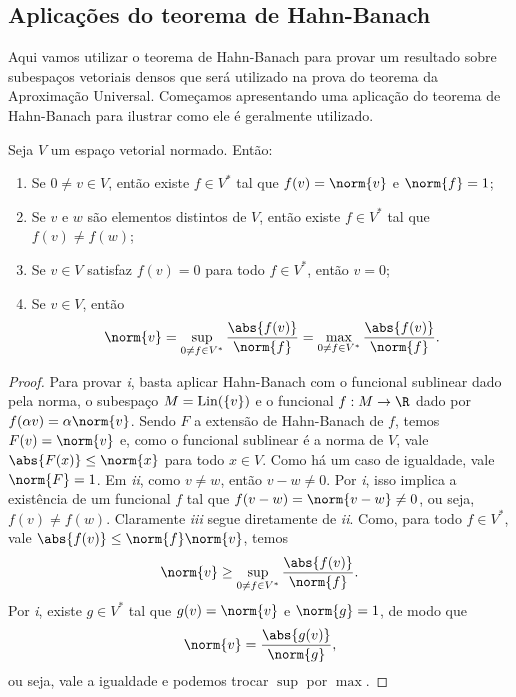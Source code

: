 \subsection{Aplicações do teorema de Hahn-Banach}

Aqui vamos utilizar o teorema de Hahn-Banach para provar um resultado sobre subespaços vetoriais densos que será utilizado na prova do teorema da Aproximação Universal.
Começamos apresentando uma aplicação do teorema de Hahn-Banach para ilustrar como ele é geralmente utilizado.

\begin{teo}
    Seja \( V \) um espaço vetorial normado.
    Então:
    \begin{enumerate}[label=\roman*)]
        \item Se \( 0 \neq v \in V \), então existe \( f \in V^{ * } \) tal que \( f(v) = \norm{ v } \) e \( \norm{ f } = 1 \);
        \item Se \( v \) e \( w \) são elementos distintos de \( V \), então existe \( f \in V^{ * } \) tal que \( f(v) \neq f(w) \);
        \item Se \( v \in V \) satisfaz \( f(v) = 0 \) para todo \( f \in V^{ * } \), então \( v = 0 \);
        \item Se \( v \in V \), então
        \begin{equation}
            \norm{ v }
            = \sup_{ 0 \neq f \in V^{ * } } \frac{ \abs{ f(v) } }{ \norm{ f } }
            = \max_{ 0 \neq f \in V^{ * } } \frac{ \abs{ f(v) } }{ \norm{ f } }
        .\end{equation}
    \end{enumerate}
\end{teo}
\begin{proof}
    Para provar \emph{i}, basta aplicar Hahn-Banach com o funcional sublinear dado pela norma, o subespaço \( M = \operatorname{Lin} (\left\{ v \right\}) \) e o funcional \( f : M \to \R \) dado por \( f(\alpha v) = \alpha \norm{ v } \).
    Sendo \( F \) a extensão de Hahn-Banach de \( f \), temos \( F(v) = \norm{ v } \) e, como o funcional sublinear é a norma de \( V \), vale \( \abs{ F(x) } \leq \norm{ x } \) para todo \( x \in V \).
    Como há um caso de igualdade, vale \( \norm{ F } = 1 \).
    Em \emph{ii}, como \( v \neq w \), então \( v - w \neq 0 \).
    Por \emph{i}, isso implica a existência de um funcional \( f \) tal que \( f(v - w) = \norm{ v - w } \neq 0 \), ou seja, \( f(v) \neq f(w) \).
    Claramente \emph{iii} segue diretamente de \emph{ii}.
    Como, para todo \( f \in V^{ * } \), vale \( \abs{ f(v) } \leq \norm{ f } \norm{ v } \), temos
    \begin{equation}
        \norm{ v } \geq \sup_{ 0 \neq f \in V^{ * } } \frac{ \abs{ f(v) } }{ \norm{ f } }
    .\end{equation}
    Por \emph{i}, existe \( g \in V^{ * } \) tal que \( g(v) = \norm{ v } \) e \( \norm{ g } = 1 \), de modo que
    \begin{equation}
        \norm{ v } = \frac{ \abs{ g(v) } }{ \norm{ g } }
    ,\end{equation}
    ou seja, vale a igualdade e podemos trocar \( \sup \) por \( \max \).
\end{proof}

